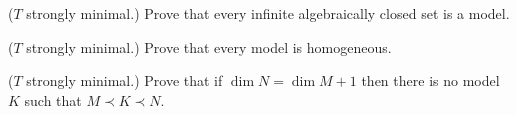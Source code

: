 \begin{exercise}\label{ex_infinite_acl}
($T$ strongly minimal.) Prove that every infinite algebraically closed set is a model.\QED
\end{exercise}

\begin{exercise}
($T$ strongly minimal.) Prove that every model is homogeneous.\QED 
\end{exercise}

\begin{exercise}
($T$ strongly minimal.) Prove that if $\dim N=\dim M+1$ then there is no model $K$ such that $M\prec K\prec N$.\QED 
\end{exercise}




% 

